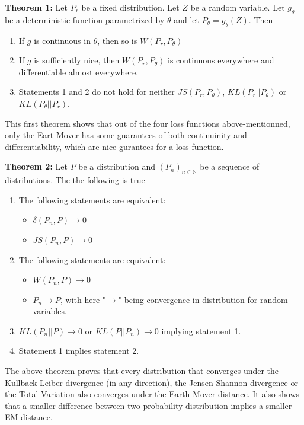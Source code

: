 \documentclass{article}
\begin{document}
\textbf{Theorem 1:} Let $P_r$ be a fixed distribution. Let $Z$ be a random variable. Let $g_{\theta}$ be a deterministic function parametrized by $\theta$ and let $P_{\theta} = g_{\theta}(Z)$. Then

\begin{enumerate}
    \item If $g$ is continuous in $\theta$, then so is $W(P_r, P_{\theta})$
    \item If $g$ is sufficiently nice, then $W(P_r, P_{\theta})$ is continuous everywhere and differentiable almost everywhere.
    \item Statements 1 and 2 do not hold for neither $JS(P_r, P_{\theta})$, $KL(P_r||P_{\theta})$ or $KL(P_{\theta}||P_r)$.
\end{enumerate}

This first theorem shows that out of the four loss functions above-mentionned, only the Eart-Mover has some guarantees of both continuinity and differentiability, which are nice gurantees for a loss function.

\textbf{Theorem 2:} Let $P$ be a distribution and $(P_n)_{n \in \mathbb{N}}$ be a sequence of distributions. The the following is true

\begin{enumerate}
    \item The following statements are equivalent:
    \begin{itemize}
        \item $\delta(P_n, P) \rightarrow 0$
        \item $JS(P_n, P) \rightarrow 0$
    \end{itemize}
    \item The following statements are equivalent:
    \begin{itemize}
        \item $W(P_n, P) \rightarrow 0$
        \item $P_n \rightarrow P$, with here "$\rightarrow$" being convergence in distribution for random variables. 
    \end{itemize}
    \item $KL(P_n||P) \rightarrow 0$ or $KL(P||P_n) \rightarrow 0$ implying statement 1.
    \item Statement 1 implies statement 2.
\end{enumerate}

The above theorem proves that every distribution that converges under the Kullback-Leiber divergence (in any direction), the Jensen-Shannon divergence or the Total Variation also converges under the Earth-Mover distance. It also shows that a smaller difference between two probability distribution implies a smaller EM distance. 
\end{document}
